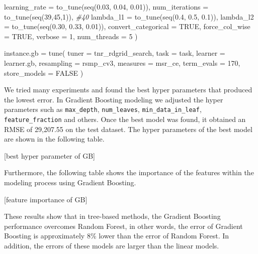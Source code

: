\documentclass[11pt,a4paper]{article}
\newenvironment{Shaded}{\begin{snugshade}}{\end{snugshade}}
\newcommand{\AttributeTok}[1]{\textcolor[rgb]{0.77,0.63,0.00}{#1}}
\newcommand{\CommentTok}[1]{\textcolor[rgb]{0.56,0.35,0.01}{\textit{#1}}}
\newcommand{\ConstantTok}[1]{\textcolor[rgb]{0.00,0.00,0.00}{#1}}
\newcommand{\DecValTok}[1]{\textcolor[rgb]{0.00,0.00,0.81}{#1}}
\newcommand{\FloatTok}[1]{\textcolor[rgb]{0.00,0.00,0.81}{#1}}
\newcommand{\FunctionTok}[1]{\textcolor[rgb]{0.00,0.00,0.00}{#1}}
\newcommand{\NormalTok}[1]{#1}
\newcommand{\OtherTok}[1]{\textcolor[rgb]{0.56,0.35,0.01}{#1}}
\begin{document}
\begin{Shaded}
\begin{Highlighting}[]
                 \AttributeTok{learning\_rate =} \FunctionTok{to\_tune}\NormalTok{(}\FunctionTok{seq}\NormalTok{(}\FloatTok{0.03}\NormalTok{, }\FloatTok{0.04}\NormalTok{, }\FloatTok{0.01}\NormalTok{)),}
                 \AttributeTok{num\_iterations  =} \FunctionTok{to\_tune}\NormalTok{(}\FunctionTok{seq}\NormalTok{(}\DecValTok{39}\NormalTok{,}\DecValTok{45}\NormalTok{,}\DecValTok{1}\NormalTok{)), }\CommentTok{\#40}
                 \AttributeTok{lambda\_l1 =} \FunctionTok{to\_tune}\NormalTok{(}\FunctionTok{seq}\NormalTok{(}\FloatTok{0.4}\NormalTok{, }\FloatTok{0.5}\NormalTok{, }\FloatTok{0.1}\NormalTok{)),}
                 \AttributeTok{lambda\_l2 =} \FunctionTok{to\_tune}\NormalTok{(}\FunctionTok{seq}\NormalTok{(}\FloatTok{0.30}\NormalTok{, }\FloatTok{0.33}\NormalTok{, }\FloatTok{0.01}\NormalTok{)),}
                 \AttributeTok{convert\_categorical =} \ConstantTok{TRUE}\NormalTok{,}
                 \AttributeTok{force\_col\_wise =} \ConstantTok{TRUE}\NormalTok{,}
                 \AttributeTok{verbose =} \DecValTok{1}\NormalTok{,}
                 \AttributeTok{num\_threads =} \DecValTok{5}
\NormalTok{)}

\NormalTok{instance.gb }\OtherTok{=} \FunctionTok{tune}\NormalTok{(}
  \AttributeTok{tuner =}\NormalTok{ tnr\_rdgrid\_search,}
  \AttributeTok{task =}\NormalTok{ task,}
  \AttributeTok{learner =}\NormalTok{ learner.gb,}
  \AttributeTok{resampling =}\NormalTok{ rsmp\_cv3,}
  \AttributeTok{measures =}\NormalTok{ msr\_ce,}
  \AttributeTok{term\_evals =} \DecValTok{170}\NormalTok{,}
  \AttributeTok{store\_models =} \ConstantTok{FALSE}
\NormalTok{)}
\end{Highlighting}
\end{Shaded}

We tried many experiments and found the best hyper parameters that
produced the lowest error. In Gradient Boosting modeling we adjusted the
hyper parameters such as \texttt{max\_depth}, \texttt{num\_leaves},
\texttt{min\_data\_in\_leaf}, \texttt{feature\_fraction} and others.
Once the best model was found, it obtained an RMSE of 29,207.55 on the
test dataset. The hyper parameters of the best model are shown in the
following table.

{[}best hyper parameter of GB{]}

Furthermore, the following table shows the importance of the features
within the modeling process using Gradient Boosting.

{[}feature importance of GB{]}

These results show that in tree-based methods, the Gradient Boosting
performance overcomes Random Forest, in other words, the error of
Gradient Boosting is approximately 8\% lower than the error of Random
Forest. In addition, the errors of these models are larger than the
linear models.
\end{document}
